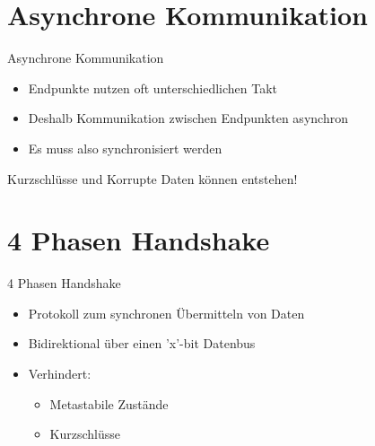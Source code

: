 
  \section{Asynchrone Kommunikation}
  \begin{frame} {Asynchrone Kommunikation}
    \begin{block} {}
      \begin{itemize}
        \item Endpunkte nutzen oft unterschiedlichen Takt
        \item Deshalb Kommunikation zwischen Endpunkten asynchron
        \item Es muss also synchronisiert werden
      \end{itemize}
    \end{block}
    \begin{alertblock} {}
      Kurzschlüsse und Korrupte Daten können entstehen!
    \end{alertblock}
  \end{frame}


  \section{4 Phasen Handshake}
  \begin{frame} {4 Phasen Handshake}
    \begin{block} {}
      \begin{itemize}
        \item Protokoll zum synchronen Übermitteln von Daten
        \item Bidirektional über einen 'x'-bit Datenbus
        \item Verhindert:
        \begin{itemize}
          \item Metastabile Zustände
          \item Kurzschlüsse
        \end{itemize}
      \end{itemize}
    \end{block}
  \end{frame}

